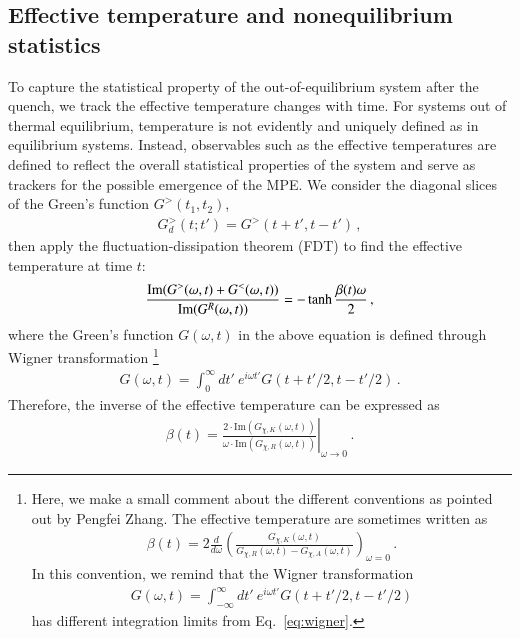 \subsection{Effective temperature and nonequilibrium statistics}
To capture the statistical property of the out-of-equilibrium system after the quench, we track the effective temperature changes with time. For systems out of thermal equilibrium, temperature is not evidently and uniquely defined as in equilibrium systems. Instead, observables such as the effective temperatures are defined to reflect the overall statistical properties of the system and serve as trackers for the possible emergence of the MPE. We consider the diagonal slices of the Green's function $G^>(t_1,t_2)$,
\begin{align}
    G_d^>(t;t')=G^>(t+t',t-t')\,,
\end{align}
then apply the fluctuation-dissipation theorem (FDT) \cite{kamenev2023field,kubo1966fluctuation,zhang2021quantum} to find the effective temperature at time $t$:
\begin{align}
    \frac{\mathrm{Im}(G^>({\omega},t)+G^<({\omega},t))}{\mathrm{Im}(G^R({\omega},t))}=-\tanh{\frac{\beta(t) {\omega}}{2}}\,,
\end{align}
where the Green's function $G(\omega,t)$ in the above equation is defined through Wigner transformation \footnote{Here, we make a small comment about the different conventions as pointed out by Pengfei Zhang. The effective temperature are sometimes written as \cite{zhang2019evaporation}
\begin{gather}
    \beta(t)=2\frac{d}{d\omega}\left(\frac{G_{\chi,K}(\omega,t)}{G_{\chi,R}(\omega,t)-G_{\chi,A}(\omega,t)}\right)_{\omega=0}\,.
    \label{eq:wrongt}
\end{gather}
In this convention, we remind that the Wigner transformation
\begin{gather}
    G(\omega,t)=\int_{-\infty}^\infty dt' \ e^{i \omega t'} G(t+t'/2,t-t'/2)
\end{gather}
has different integration limits from Eq.~\eqref{eq:wigner}.}
\begin{gather}
    G(\omega,t)=\int_0^\infty dt' \ e^{i \omega t'} G(t+t'/2,t-t'/2)\,.
    \label{eq:wigner}
\end{gather}
Therefore, the inverse of the effective temperature can be expressed as \cite{eberlein2017quantum}
\begin{gather}
    \beta(t)=\left.\frac{2 \cdot \mathrm{Im}(G_{\chi,K}(\omega,t))}{\omega \cdot \mathrm{Im}(G_{\chi,R}(\omega,t))}\right|_{\omega\rightarrow 0}\,.
    \label{eq:effectivetemp}
\end{gather}
